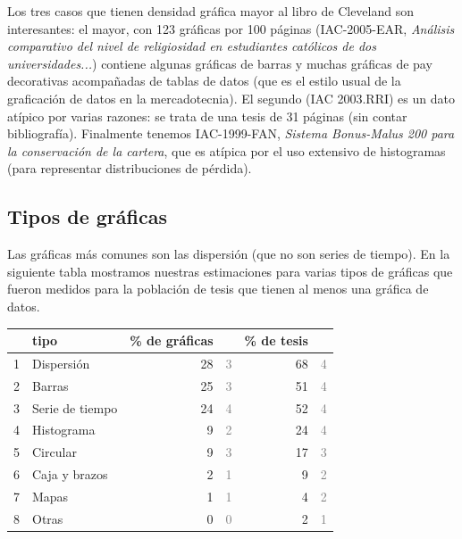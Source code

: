 \documentclass{tufte-handout}\usepackage{graphicx, color}
\begin{document}
Los tres casos que tienen densidad gráfica mayor
al libro de Cleveland son interesantes: el mayor,
con 123 gráficas por 100 páginas (IAC-2005-EAR, 
{\it Análisis comparativo del nivel de religiosidad en estudiantes católicos de dos universidades...})
contiene algunas gráficas de barras y muchas gráficas de pay decorativas 
acompañadas de tablas de datos (que es el estilo
usual de la graficación de datos en la mercadotecnia). El segundo
(IAC 2003.RRI) es un dato atípico por varias razones: se trata de una
tesis de 31 páginas (sin contar bibliografía). Finalmente
tenemos IAC-1999-FAN, {\it Sistema Bonus-Malus 200 para
la conservación de la cartera}, que es atípica por el uso
extensivo de histogramas (para representar distribuciones de
pérdida).





\subsection{Tipos de gráficas}

Las gráficas más comunes son las dispersión (que no
son series de tiempo). En la siguiente tabla  mostramos
nuestras estimaciones para varias tipos de gráficas que
fueron medidos para la población de tesis que tienen al
menos una gráfica de datos.  





\begin{table}[ht]
\centering
\begin{tabular}{rlrrrr}
  \hline
 & tipo & \% de gráficas &  & \% de tesis &  \\ 
  \hline
1 & Dispersión & 28 & \textcolor{gray}{ 3 } & 68 & \textcolor{gray}{ 4 } \\ 
  2 & Barras & 25 & \textcolor{gray}{ 3 } & 51 & \textcolor{gray}{ 4 } \\ 
  3 & Serie de tiempo & 24 & \textcolor{gray}{ 4 } & 52 & \textcolor{gray}{ 4 } \\ 
  4 & Histograma & 9 & \textcolor{gray}{ 2 } & 24 & \textcolor{gray}{ 4 } \\ 
  5 & Circular & 9 & \textcolor{gray}{ 3 } & 17 & \textcolor{gray}{ 3 } \\ 
  6 & Caja y brazos & 2 & \textcolor{gray}{ 1 } & 9 & \textcolor{gray}{ 2 } \\ 
  7 & Mapas & 1 & \textcolor{gray}{ 1 } & 4 & \textcolor{gray}{ 2 } \\ 
  8 & Otras & 0 & \textcolor{gray}{ 0 } & 2 & \textcolor{gray}{ 1 } \\ 
   \hline
\end{tabular}
\end{table}
\end{document}
